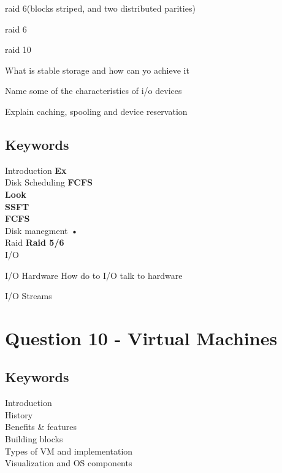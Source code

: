 \documentclass[a4paper,10pt,titlepage]{report}
\begin{document}
	raid 6(blocks striped, and two distributed parities)
	
	raid 6
	
	raid 10
	
	What is stable storage and how can yo achieve it
	
	Name some of the characteristics of i/o devices
	
	Explain caching, spooling and device reservation
	

\subsection{Keywords}
Introduction
\hspace{10mm} \textbf{Ex} \\
Disk Scheduling 
\hspace{15mm} \textbf{FCFS} \\
\hspace{15mm} \textbf{Look} \\
\hspace{15mm} \textbf{SSFT} \\
\hspace{15mm} \textbf{FCFS} \\



Disk manegment 
\hspace{5mm} \textbf{•} \\


Raid
\hspace{5mm} \textbf{Raid 5/6} \\

I/O

I/O Hardware
	How do to I/O talk to hardware

I/O Streams
	

\section{Question 10 - Virtual Machines }



\subsection{Keywords}
Introduction\\
History\\
Benefits \& features\\
Building blocks\\
Types of VM and implementation\\
Visualization and OS components \\
\end{document}
